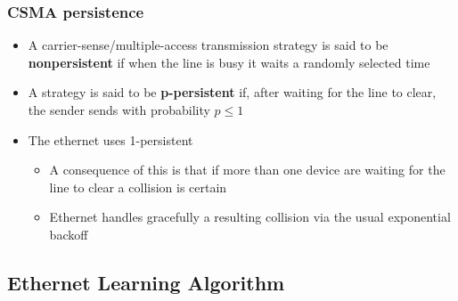 \documentclass[11pt]{article}
\providecommand{\tightlist}{%
      \setlength{\itemsep}{0pt}\setlength{\parskip}{0pt}}
\begin{document}
    \subsubsection{CSMA persistence}\label{csma-persistence}

\begin{itemize}
\tightlist
\item
  A carrier-sense/multiple-access transmission strategy is said to be
  \textbf{nonpersistent} if when the line is busy it waits a randomly
  selected time
\item
  A strategy is said to be \textbf{p-persistent} if, after waiting for
  the line to clear, the sender sends with probability \(p\leq 1\)
\item
  The ethernet uses 1-persistent

  \begin{itemize}
  \tightlist
  \item
    A consequence of this is that if more than one device are waiting
    for the line to clear a collision is certain
  \item
    Ethernet handles gracefully a resulting collision via the usual
    exponential backoff
  \end{itemize}
\end{itemize}

    \subsection{Ethernet Learning
Algorithm}\label{ethernet-learning-algorithm}
\end{document}
